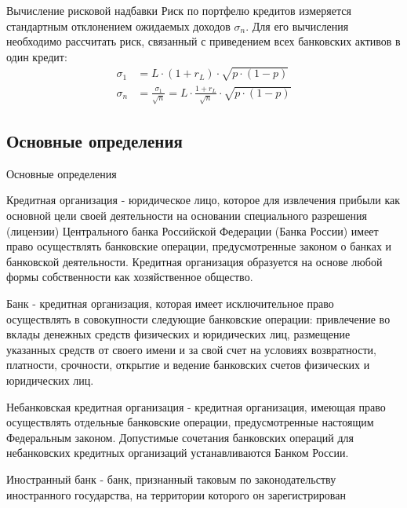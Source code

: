\documentclass[_Banking_p1.tex]{subfiles}
\begin{document}
\begin{frame}{Вычисление рисковой надбавки}
Риск по портфелю кредитов измеряется стандартным отклонением ожидаемых доходов $\sigma_n$. Для его вычисления необходимо рассчитать риск, связанный с приведением всех банковских активов в один кредит:
\begin{align}
\sigma_1&=L\cdot (1+r_L) \cdot \sqrt{p \cdot(1-p)}\\
\sigma_n&=\frac{\sigma_1}{\sqrt{n}}=L\cdot \frac{1+r_L}{\sqrt{n}} \cdot \sqrt{p \cdot(1-p)}
\end{align}
\end{frame}
\subsection{Основные определения}
\begin{frame}[allowframebreaks]{Основные определения}{}
\begin{block}{Кредитная организация }
\quad
- юридическое лицо, которое для извлечения прибыли как основной цели своей деятельности на основании специального разрешения (лицензии) Центрального банка Российской Федерации (Банка России) имеет право осуществлять банковские операции, предусмотренные законом о банках и банковской деятельности. Кредитная организация образуется на основе любой формы собственности как хозяйственное общество.
\end{block}
\pagebreak

\begin{block}{Банк }
\quad
- кредитная организация, которая имеет исключительное право осуществлять в совокупности следующие банковские операции: привлечение во вклады денежных средств физических и юридических лиц, размещение указанных средств от своего имени и за свой счет на условиях возвратности, платности, срочности, открытие и ведение банковских счетов физических и юридических лиц.

\end{block}
\pagebreak

\begin{block}{Небанковская кредитная организация}
\quad
- кредитная организация, имеющая право осуществлять отдельные банковские операции, предусмотренные настоящим Федеральным законом. Допустимые сочетания банковских операций для небанковских кредитных организаций устанавливаются Банком России.
\end{block}
\pagebreak

\begin{block}{Иностранный банк}
\quad
- банк, признанный таковым по законодательству иностранного государства, на территории которого он зарегистрирован
\end{block}
\pagebreak


\end{frame}
\end{document}
